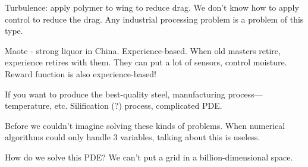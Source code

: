 Turbulence: apply polymer to wing to reduce drag. We don't know how to apply control to reduce the drag. Any industrial processing problem is a problem of this type. 

Maote - strong liquor in China. Experience-based. When old masters retire, experience retires with them. They can put a lot of sensors, control moisture. Reward function is also experience-based!

If you want to produce the best-quality steel, manufacturing process---temperature, etc. Silification (?) process, complicated PDE.

Before we couldn't imagine solving these kinds of problems. When numerical algorithms could only handle 3 variables, talking about this is useless.

How do we solve this PDE? We can't put a grid in a billion-dimensional space.


